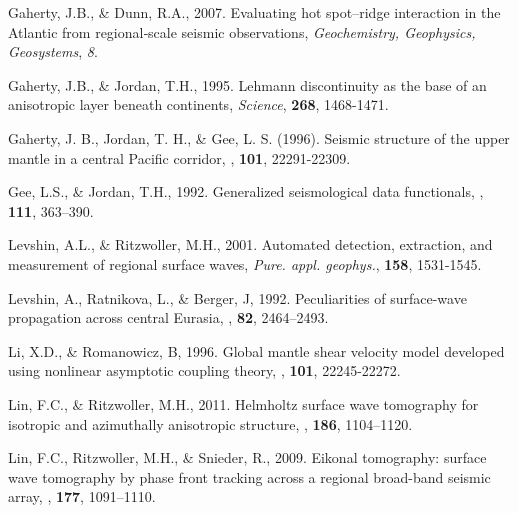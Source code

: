\documentclass{gji}
\begin{document}
\begin{thebibliography}{}
	   Gaherty, J.B., \& Dunn, R.A., 2007. Evaluating hot spot–ridge interaction in the Atlantic from regional‐scale seismic observations, \textit{Geochemistry, Geophysics, Geosystems}, \textit{8}.

	   Gaherty, J.B., \& Jordan, T.H., 1995. Lehmann discontinuity as the base of an anisotropic layer beneath continents, \textit{Science}, \textbf{268}, 1468-1471.

	   Gaherty, J. B., Jordan, T. H., \& Gee, L. S. (1996). Seismic structure of the upper mantle in a central Pacific corridor, \textit{\jgr}, \textbf{101}, 22291-22309.

	   Gee, L.S., \& Jordan, T.H., 1992. Generalized seismological data functionals, \textit{\gji}, \textbf{111}, 363–390.


	   Levshin, A.L., \& Ritzwoller, M.H., 2001. Automated detection, extraction, and measurement of regional surface waves, \textit{Pure. appl. geophys.}, \textbf{158}, 1531-1545.

	   Levshin, A., Ratnikova, L., \& Berger, J, 1992. Peculiarities of surface-wave propagation across central Eurasia, \textit{\bssa}, \textbf{82}, 2464–2493.

	   Li, X.D., \& Romanowicz, B, 1996. Global mantle shear velocity model developed using nonlinear asymptotic coupling theory, \textit{\jgr}, \textbf{101}, 22245-22272.

	   Lin, F.C., \& Ritzwoller, M.H., 2011. Helmholtz surface wave tomography for isotropic and azimuthally anisotropic structure, \textit{\gji}, \textbf{186}, 1104–1120.

	   Lin, F.C., Ritzwoller, M.H., \& Snieder, R., 2009. Eikonal tomography: surface wave tomography by phase front tracking across a regional broad-band seismic array, \textit{\gji}, \textbf{177}, 1091–1110. 


\end{thebibliography}
\end{document}
